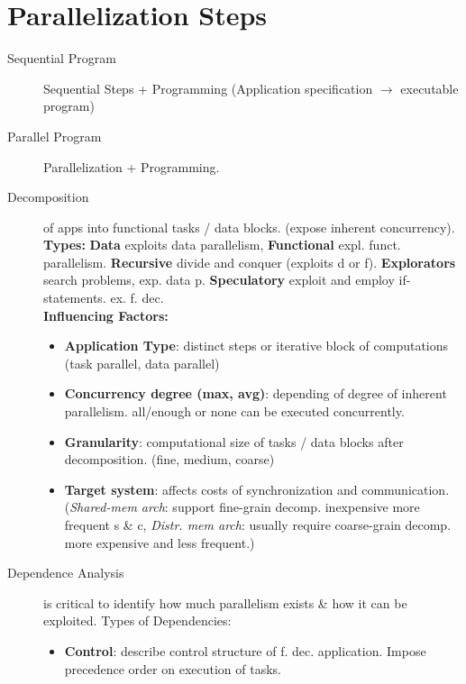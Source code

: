 \section*{Parallelization Steps}
\begin{description}
    \item[Sequential Program]Sequential Steps + Programming (Application specification $\rightarrow$ executable program)
    \item[Parallel Program]Parallelization + Programming. \\ %
        \item[Decomposition] of apps into functional tasks / data blocks. (expose inherent concurrency). \textbf{Types:} \textbf{Data} exploits data parallelism, \textbf{Functional} expl. funct. parallelism. \textbf{Recursive} divide and conquer (exploits d or f). \textbf{Explorators} search problems, exp. data p. \textbf{Speculatory} exploit and employ if-statements. ex. f. dec. \\
        \textbf{Influencing Factors:}
        \begin{itemize}
            \item \textbf{Application Type}: distinct steps or iterative block of computations (task parallel, data parallel) %
            \item \textbf{Concurrency degree (max, avg)}: depending of degree of inherent parallelism. all/enough or none can be executed concurrently.
            \item \textbf{Granularity}: computational size of tasks / data blocks after decomposition. (fine, medium, coarse)
            \item \textbf{Target system}: affects costs of synchronization and communication. (\textit{Shared-mem arch}: support fine-grain decomp. inexpensive more frequent s \& c, \textit{Distr. mem arch}: usually require coarse-grain decomp. more expensive and less frequent.)
        \end{itemize} %
    \item[Dependence Analysis]is critical to identify how much parallelism exists \& how it can be exploited. Types of Dependencies:
        \begin{itemize}
            \item \textbf{Control}: describe control structure of f. dec. application. Impose precedence order on execution of tasks.

\end{itemize}
\end{description}

